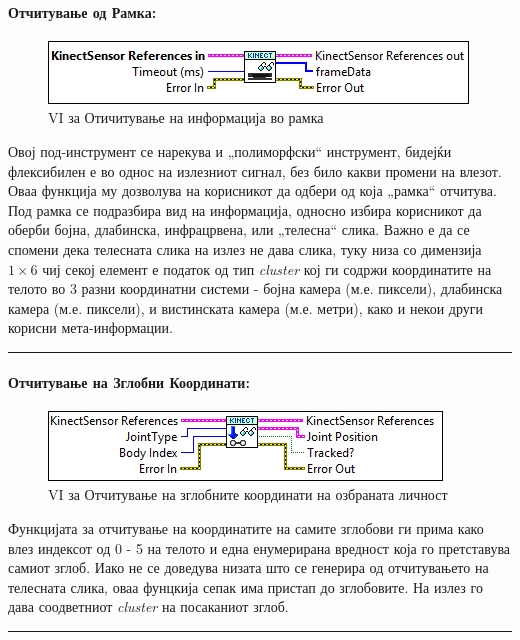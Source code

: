\documentclass[12pt]{article}
\begin{document}
      \paragraph{Отчитување од Рамка:\\}
	      \begin{figure}[H]
	        \includegraphics[width=0.55\linewidth]{./images/kinect_read_border.png}
	        \caption{VI за Отичитување на информација во рамка}
	        \label{fig:kinect_read.png}
	        \raggedright
	        \end{figure}
        Овој под-инструмент се нарекува и „полиморфски“ инструмент, бидејќи флексибилен е во однос на излезниот сигнал, без било какви промени на влезот. Оваа функција му дозволува на корисникот да одбери од која „рамка“ отчитува. Под рамка се подразбира вид на информација, односно избира корисникот да оберби бојна, длабинска, инфрацрвена, или „телесна“ слика. Важно е да се спомени дека телесната слика на излез не дава слика, туку низа со димензија $1 \times 6$ чиј секој елемент е податок од тип \textit{cluster} кој ги содржи координатите на телото во 3 разни координатни системи - бојна камера (м.е. пиксели), длабинска камера (м.е. пиксели), и вистинската камера (м.е. метри), како и некои други корисни мета-информации.
        \textcolor[RGB]{150,150,150}{\rule{\linewidth}{1.6pt}}

      \paragraph{Отчитување на Зглобни Координати:\\}
	      \begin{figure}[H]
	        \includegraphics[width=0.55\linewidth]{./images/kinect_joints_border.png}
	        \caption{VI за Отчитување на зглобните координати на озбраната личност}
	        \label{fig:kinect_joints.png}
	        \raggedright
	        \end{figure}
        Функцијата за отчитување на координатите на самите зглобови ги прима како влез индексот од 0 - 5 на телото и една енумерирана вредност која го претставува самиот зглоб. Иако не се доведува низата што се генерира од отчитувањето на телесната слика, оваа фунцкија сепак има пристап до зглобовите. На излез го дава соодветниот \textit{cluster} на посаканиот зглоб.
        \textcolor[RGB]{150,150,150}{\rule{\linewidth}{1.6pt}}
\end{document}
